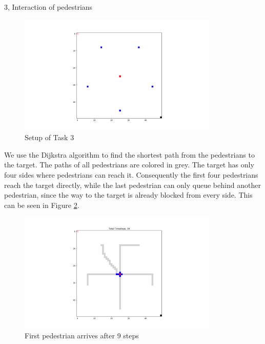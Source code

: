 \documentclass[10pt,a4paper]{article}
\begin{document}
\begin{task}{3, Interaction of pedestrians}
\begin{figure}[H]
    \centering
    \includegraphics[width=0.85\textwidth]{pictures/Task3_start.png}
    \caption{Setup of Task 3}
    \label{fig:start_3}
\end{figure}
We use the Dijkstra algorithm to find the shortest path from the pedestrians to the target. The paths of all pedestrians are colored in grey. The target has only four sides where pedestrians can reach it. Consequently the first four pedestrians reach the target directly, while the last pedestrian can only queue behind another pedestrian, since the way to the target is already blocked from every side. This can be seen in Figure \ref{fig:3_end}.
\begin{figure}[H]
    \centering
    \includegraphics[width=0.85\textwidth]{pictures/Task3_end.png}
    \caption{First pedestrian arrives after 9 steps}
    \label{fig:3_end}
\end{figure}
\end{task}
\newpage
\end{document}
